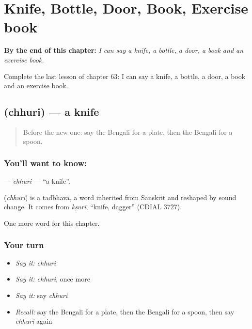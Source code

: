 
\chapter{Knife, Bottle, Door, Book, Exercise book}
\label{ch:bn-knife-bottle-door-book-exercise-book}

\begin{chapteropening}
\textbf{By the end of this chapter:} \emph{I can say a knife, a bottle, a door, a book and an exercise book.}

Complete the last lesson of chapter 63: I can say a knife, a bottle, a door, a book and an exercise book.
\end{chapteropening}

\section[\texorpdfstring{\bn{ছুরি} (chhuri)}{ছুরি (chhuri)}]{ (chhuri) — a knife}

\label{lesson:BN-C63-chhuri}



\begin{quote}
Before the new one: say the Bengali for a plate, then the Bengali for a spoon.
\end{quote}

\subsection*{You'll want to know: }
\textbf{} — \emph{chhuri} — \textquotedblleft{}a knife\textquotedblright{}.

\begin{cousinweb}
\textbf{} (\emph{chhuri}) is a tadbhava, a word inherited from Sanskrit and reshaped by sound change. It comes from \emph{kṣurī}, \textquotedblleft{}knife, dagger\textquotedblright{} (CDIAL 3727).
\end{cousinweb}

\begin{grammarlens}[title={What you've built}]
One more word for this chapter.
\end{grammarlens}

\subsection*{Your turn}
\begin{itemize}
\raggedright
  \item \emph{Say it:} \emph{chhuri}
  \item \emph{Say it:} \emph{chhuri}, once more
  \item \emph{Say it:} say \emph{chhuri}
  \item \emph{Recall:} say the Bengali for a plate, then the Bengali for a spoon, then say \emph{chhuri} again
\end{itemize}

